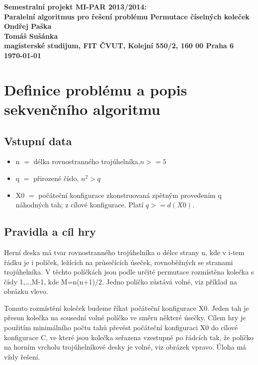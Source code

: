 \documentclass[12pt]{article}
\begin{document}

\begin{center}
\bf Semestralní projekt MI-PAR 2013/2014:\\[5mm]
    Paralelní algoritmus pro řešení problému Permutace číselných koleček\\[5mm]
       Ondřej Paška\\
       Tomáš Sušánka\\[2mm]
magisterské studijum, FIT ČVUT, Kolejní 550/2, 160 00 Praha 6\\[2mm]
\today
\end{center}

\section{Definice problému a popis sekvenčního algoritmu}

\subsection{Vstupní data}

\begin{itemize}
\item n \(=\) délka rovnostranného trojúhelníka,\(n >= 5\)
\item q \(=\) přirozené číslo, \(n^2 > q\)
\item X0 \(=\) počáteční konfigurace zkonstruovaná zpětným provedením q náhodných tah; z cílové konfigurace. Platí \(q >= d(X0)\). 
\end{itemize}

\subsection{Pravidla a cíl hry}

Herní deska má tvar rovnostranného trojúhelníka o délce strany n, kde v i-tem řádku je i políček, ležících na průsečících úseček, rovnoběžných se stranami trojúhelníka. V těchto políčkách jsou podle určité permutace rozmístěna kolečka s čísly 1,…,M-1, kde M=n(n+1)/2. Jedno políčko zůstává volné, viz příklad na obrázku vlevo.

Tomuto rozmístění koleček budeme říkat počáteční konfigurace X0. Jeden tah je přesun kolečka na sousední volné políčko ve směru některé úsečky. Cílem hry je použitím minimálního počtu tahů převést počáteční konfiguraci X0 do cílové konfigurace C, ve které jsou kolečka seřazena vzestupně po řádcích tak, že políčko na horním vrcholu trojúhelníkové desky je volné, viz obrázek vpravo. Úloha má vždy řešení.
\end{document}

